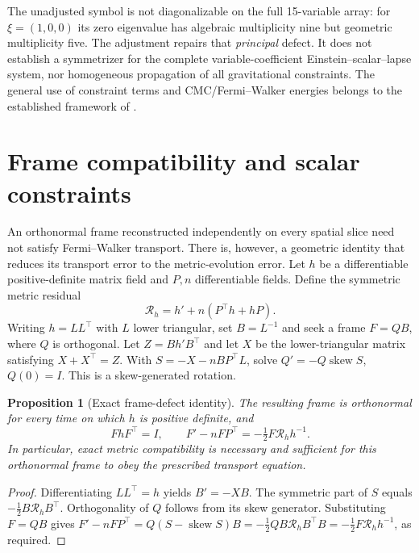\documentclass[11pt,a4paper]{article}
\newtheorem{proposition}[theorem]{Proposition}
\theoremstyle{remark}
\begin{document}
The unadjusted symbol is not diagonalizable on the full 15-variable array: for $\xi=(1,0,0)$ its zero eigenvalue has algebraic multiplicity nine but geometric multiplicity five. The adjustment repairs that \emph{principal} defect. It does not establish a symmetrizer for the complete variable-coefficient Einstein--scalar--lapse system, nor homogeneous propagation of all gravitational constraints. The general use of constraint terms and CMC/Fermi--Walker energies belongs to the established framework of \cite{FRS}.

\section{Frame compatibility and scalar constraints}
\label{sec:frame-compatibility}
An orthonormal frame reconstructed independently on every spatial slice need not satisfy Fermi--Walker transport. There is, however, a geometric identity that reduces its transport error to the metric-evolution error. Let $h$ be a differentiable positive-definite matrix field and $P,n$ differentiable fields. Define the symmetric metric residual
\begin{equation}\label{eq:newRh}
\mathcal R_h=h'+n(P^\top h+hP).
\end{equation}
Writing $h=LL^\top$ with $L$ lower triangular, set $B=L^{-1}$ and seek a frame $F=QB$, where $Q$ is orthogonal. Let $Z=Bh'B^\top$ and let $X$ be the lower-triangular matrix satisfying $X+X^\top=Z$. With $S=-X-nBP^\top L$, solve $Q'=-Q\operatorname{skew}S$, $Q(0)=I$. This is a skew-generated rotation.

\begin{proposition}[Exact frame-defect identity]\label{prop:newframe}
The resulting frame is orthonormal for every time on which $h$ is positive definite, and
\begin{equation}\label{eq:newFres}
FhF^\top=I,\qquad F'-nFP^\top=-\tfrac12F\mathcal R_hh^{-1}.
\end{equation}
In particular, exact metric compatibility is necessary and sufficient for this orthonormal frame to obey the prescribed transport equation.
\end{proposition}
\begin{proof}
Differentiating $LL^\top=h$ yields $B'=-XB$. The symmetric part of $S$ equals $-\tfrac12B\mathcal R_hB^\top$. Orthogonality of $Q$ follows from its skew generator. Substituting $F=QB$ gives
$F'-nFP^\top=Q(S-\operatorname{skew}S)B
=-\tfrac12QB\mathcal R_hB^\top B
=-\tfrac12F\mathcal R_hh^{-1}$, as required.
\end{proof}
\end{document}
